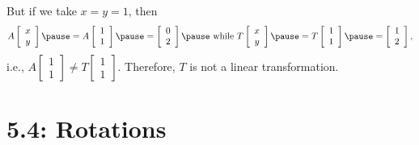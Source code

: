 \documentclass[pdf
]{beamer}
\begin{document}
{{\begin{example}
			But if we take $x=y=1$, 
			\pause then 
			\[ A\left[\begin{array}{c} x \\ y \end{array}\right]
			\pause
			=A\left[\begin{array}{c} 1 \\ 1 \end{array}\right]
			\pause
			=\left[\begin{array}{c} 0 \\ 2 \end{array}\right]
			\pause
			\mbox{ while }
			T\left[\begin{array}{c} x \\ y \end{array}\right]
			\pause
			=T\left[\begin{array}{c} 1 \\ 1 \end{array}\right]
			\pause
			=\left[\begin{array}{c} 1 \\ 2 \end{array}\right], \]
			\pause
			i.e., $A\left[\begin{array}{c} 1 \\ 1 \end{array}\right]
			\neq T\left[\begin{array}{c} 1 \\ 1 \end{array}\right]$.
			\pause
			Therefore, $T$ is \alert{not} a linear transformation.
		\end{example}
	}
}
\section{5.4: Rotations}

%	
\end{document}

